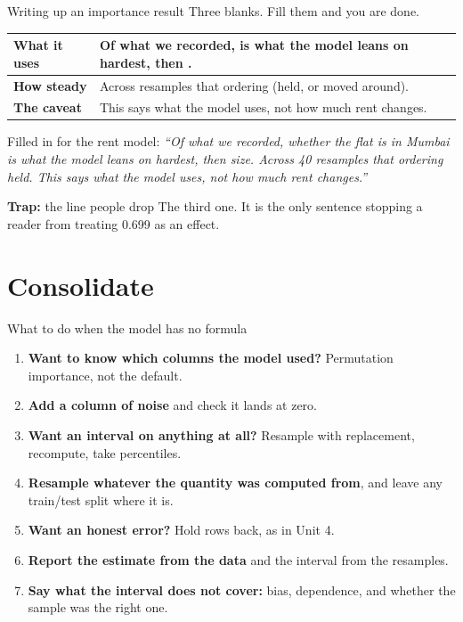 \documentclass[aspectratio=169]{beamer}
\newenvironment{trap}[1]{\begin{alertblock}{\textbf{Trap:} #1}}{\end{alertblock}}
\begin{document}
\begin{frame}{Writing up an importance result}
Three blanks. Fill them and you are done.
\begin{center}\small
\begin{tabular}{L{0.18\textwidth} L{0.70\textwidth}}
\toprule
\textbf{What it uses} & Of what we recorded, \underline{\hspace{1.6cm}} is what the model leans
on hardest, then \underline{\hspace{1.6cm}}. \\
\midrule
\textbf{How steady} & Across \underline{\hspace{0.9cm}} resamples that ordering
\underline{\hspace{1.6cm}} (held, or moved around). \\
\midrule
\textbf{The caveat} & This says what the model uses, not how much rent changes. \\
\bottomrule
\end{tabular}
\end{center}
\vspace{0.3em}
Filled in for the rent model: \emph{``Of what we recorded, whether the flat is in Mumbai is what
the model leans on hardest, then size. Across 40 resamples that ordering held. This says what the
model uses, not how much rent changes.''}
\vspace{0.2em}
\begin{trap}{the line people drop}
The third one. It is the only sentence stopping a reader from treating 0.699 as an effect.
\end{trap}
\end{frame}

\section{Consolidate}
\begin{frame}{What to do when the model has no formula}
\small
\begin{enumerate}
  \item \textbf{Want to know which columns the model used?} Permutation importance, not the
        default.
  \item \textbf{Add a column of noise} and check it lands at zero.
  \item \textbf{Want an interval on anything at all?} Resample with replacement, recompute,
        take percentiles.
  \item \textbf{Resample whatever the quantity was computed from}, and leave any train/test split
        where it is.
  \item \textbf{Want an honest error?} Hold rows back, as in Unit 4.
  \item \textbf{Report the estimate from the data} and the interval from the resamples.
  \item \textbf{Say what the interval does not cover:} bias, dependence, and whether the sample
        was the right one.
\end{enumerate}
\end{frame}
\end{document}
